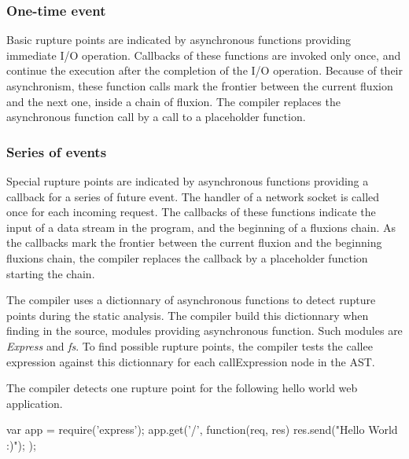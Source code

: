 \subsubsection{One-time event} \label{sss:post}

Basic rupture points are indicated by asynchronous functions providing immediate I/O operation.
Callbacks of these functions are invoked only once, and continue the execution after the completion of the I/O operation.
Because of their asynchronism, these function calls mark the frontier between the current fluxion and the next one, inside a chain of fluxion.
The compiler replaces the asynchronous function call by a call to a placeholder function.

\subsubsection{Series of events} \label{sss:start}

Special rupture points are indicated by asynchronous functions providing a callback for a series of future event.
The handler of a network socket is called once for each incoming request.
The callbacks of these functions indicate the input of a data stream in the program, and the beginning of a fluxions chain.
As the callbacks mark the frontier between the current fluxion and the beginning fluxions chain, the compiler replaces the callback by a placeholder function starting the chain.

The compiler uses a dictionnary of asynchronous functions to detect rupture points during the static analysis.
The compiler build this dictionnary when finding in the source, modules providing asynchronous function.
Such modules are \textit{Express} and \textit{fs}.
To find possible rupture points, the compiler tests the callee expression against this dictionnary for each callExpression node in the AST.

The compiler detects one rupture point for the following hello world web application. 

\begin{code}[Javascript, caption={Hello World},label={lst:hello}]
var app = require('express');
app.get('/', function(req, res) {
  res.send("Hello World :)");
});
\end{code}

